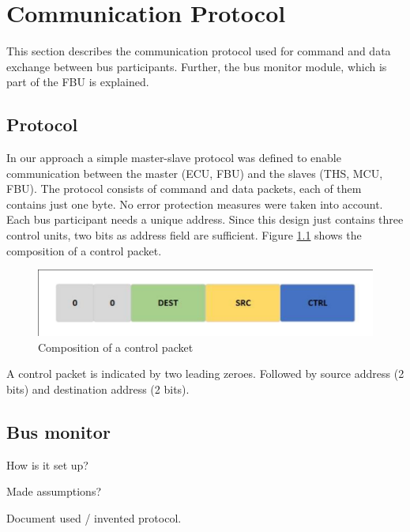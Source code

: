 \chapter{Communication Protocol}

This section describes the communication protocol used for command and data exchange between bus participants. Further, the bus monitor module, which is part of the \gls{FBU} is explained.

\section{Protocol}

In our approach a simple master-slave protocol was defined to enable communication between the master (\gls{ECU}, \gls{FBU}) and the slaves (\gls{THS}, \gls{MCU}, \gls{FBU}).
The protocol consists of command and data packets, each of them contains just one byte.
No error protection measures were taken into account.
Each bus participant needs a unique address. Since this design just contains three control units, two bits as address field are sufficient. Figure \ref{fig:ControlPacket} shows the composition of a control packet.

\begin{figure}[h!]
    \centering
    \includegraphics[width=\textwidth]{figures/ControlPacket.pdf}
    \caption{Composition of a control packet}\label{fig:ControlPacket}
\end{figure}

A control packet is indicated by two leading zeroes. Followed by source address (2 bits) and destination address (2 bits).

\section{Bus monitor}

How is it set up?

Made assumptions?

Document used / invented protocol.

